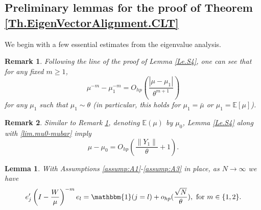 \documentclass[11pt, reqno]{amsart}
\DeclareMathOperator{\one}{\mathbbm{1}} %
\numberwithin{equation}{section}
\newtheorem{lemma}{Lemma}[section]
\newtheorem{remark}{Remark}[section]
\newcommand{\E}{\mbox{${\mathbb E}$}}
\begin{document}
\subsection{Preliminary lemmas for the proof of Theorem \ref{Th.EigenVectorAlignment.CLT}}
We begin with a few essential estimates from the eigenvalue analysis. 
\begin{remark}\label{Error.negpow,mumu0}
Following the line of the proof of Lemma \ref{Le.S4}, one can see that for any fixed $m \ge 1$,
\begin{equation}
\mu^{-m} - \mu_1^{-m} = O_{hp}\left(\frac{|\mu-\mu_1|}{\theta^{m+1}}\right)
\end{equation}
for any $\mu_1$ such that $\mu_1 \sim \theta$ (in particular, this holds for $\mu_1=\bar{\mu}$ or $\mu_1=\E[\mu]$).
\end{remark}
\begin{remark}
Similar to Remark \ref{Error.negpow,mumu0}, denoting $\mathbb E(\mu)$ by $\mu_0$, Lemma \ref{Le.S4} along with \eqref{lim.mu0-mubar} imply  
\begin{equation}\label{Error.mu-mu0}
\mu - \mu_0 = O_{hp}\left(\frac{\|Y_1\|}{\theta} + 1\right).   
\end{equation}
\end{remark}
\begin{lemma}\label{EigenVector.1}
With Assumptions \ref{assump:A1}-\ref{assump:A3} in place, as $N \to \infty$ we have %
\[
e_j^\prime\left(I - \frac{W}{\mu}\right)^{-m}e_l = \one(j =l) + o_{hp}(\frac{\sqrt{N}}{\theta}), \text{ for } m\in \{1,2\}.
\]
\end{lemma}
\end{document}
